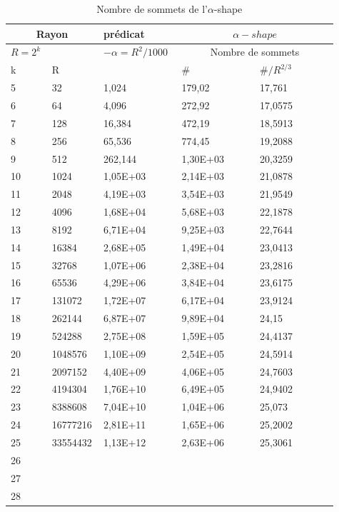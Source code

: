 \begin{table}[H]
  \begin{tabular}{|p{0.09\linewidth}|p{0.13\linewidth}||p{0.23\linewidth}||p{0.23\linewidth}|p{0.23\linewidth}|}
    \hline
    \multicolumn{2}{|c||}{Rayon} & prédicat               & \multicolumn{2}{|c|}{$\alpha-shape$} \\  \hline 
    $R=2^k$  &                   & $-\alpha = R^{2}/1000$ & \multicolumn{2}{|c|}{Nombre de sommets} \\ \hline
    k        & R                 &                        & \# & $\# / R^{2/3}$ \\ 
    \hline
    5 & 32 & 1,024 & 179,02 & 17,761\\
    6 & 64 & 4,096 & 272,92 & 17,0575\\
    7 & 128 & 16,384 & 472,19 & 18,5913\\
    8 & 256 & 65,536 & 774,45 & 19,2088\\
    9 & 512 & 262,144 & 1,30E+03 & 20,3259\\
    10 & 1024 & 1,05E+03 & 2,14E+03 & 21,0878\\
    11 & 2048 & 4,19E+03 & 3,54E+03 & 21,9549\\
    12 & 4096 & 1,68E+04 & 5,68E+03 & 22,1878\\
    13 & 8192 & 6,71E+04 & 9,25E+03 & 22,7644\\
    14 & 16384 & 2,68E+05 & 1,49E+04 & 23,0413\\
    15 & 32768 & 1,07E+06 & 2,38E+04 & 23,2816\\
    16 & 65536 & 4,29E+06 & 3,84E+04 & 23,6175\\
    17 & 131072 & 1,72E+07 & 6,17E+04 & 23,9124\\
    18 & 262144 & 6,87E+07 & 9,89E+04 & 24,15\\
    19 & 524288 & 2,75E+08 & 1,59E+05 & 24,4137\\
    20 & 1048576 & 1,10E+09 & 2,54E+05 & 24,5914\\
    21 & 2097152 & 4,40E+09 & 4,06E+05 & 24,7603\\
    22 & 4194304 & 1,76E+10 & 6,49E+05 & 24,9402\\
    23 & 8388608 & 7,04E+10 & 1,04E+06 & 25,073\\
    24 & 16777216 & 2,81E+11 & 1,65E+06 & 25,2002\\
    25 & 33554432 & 1,13E+12 & 2,63E+06 & 25,3061\\
    26 &  &  &  & \\
    27 &  &  &  & \\
    28 &  &  &  & \\
    \hline
  \end{tabular} 
  \caption{Nombre de sommets de l'$\alpha$-shape}
\end{table}


